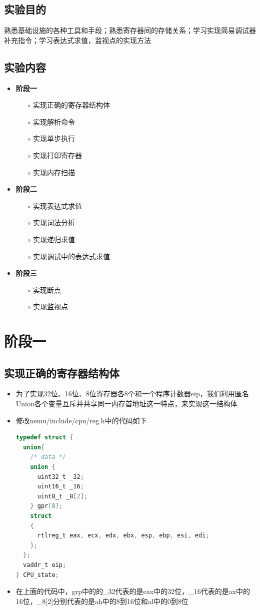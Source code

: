 \documentclass[UTF8,a4paper,10pt]{ctexart}
\begin{document}
\subsection{实验目的}
熟悉基础设施的各种工具和手段；熟悉寄存器间的存储关系；学习实现简易调试器
补充指令；学习表达式求值，监视点的实现方法
\subsection{实验内容}
\begin{itemize}
  \item \textbf{阶段一}
  \begin{itemize}
    \item [$\circ $] 实现正确的寄存器结构体
    \item [$\circ $] 实现解析命令
    \item [$\circ $] 实现单步执行
    \item [$\circ $] 实现打印寄存器
    \item [$\circ $] 实现内存扫描
  \end{itemize}
  \item \textbf{阶段二}
  \begin{itemize}
    \item [$\circ $] 实现表达式求值
    \item [$\circ $] 实现词法分析
    \item [$\circ $] 实现递归求值
    \item [$\circ $] 实现调试中的表达式求值
  \end{itemize}
  \item \textbf{阶段三}
  \begin{itemize}
    \item [$\circ $] 实现断点
    \item [$\circ $] 实现监视点
  \end{itemize}
\end{itemize}
\section{阶段一}
\subsection{实现正确的寄存器结构体}
\begin{itemize}
  \item 为了实现32位、16位、8位寄存器各8个和一个程序计数器eip，我们利用匿名Union各个变量互斥并共享同一内存首地址这一特点，来实现这一结构体
  \item 修改nemu/include/cpu/reg.h中的代码如下
  \begin{lstlisting}[language = C]    
typedef struct {
  union{
    /* data */
    union {
      uint32_t _32;
      uint16_t _16;
      uint8_t _8[2];
    } gpr[8];
    struct 
    {
      rtlreg_t eax, ecx, edx, ebx, esp, ebp, esi, edi;
    };
  };
  vaddr_t eip;
} CPU_state;
  \end{lstlisting}
  \item 在上面的代码中，grp中的的\_32代表的是eax中的32位，\_16代表的是ax中的16位，\_8[2]分别代表的是ah中的8到16位和al中的0到8位
\end{itemize}
\end{document}

